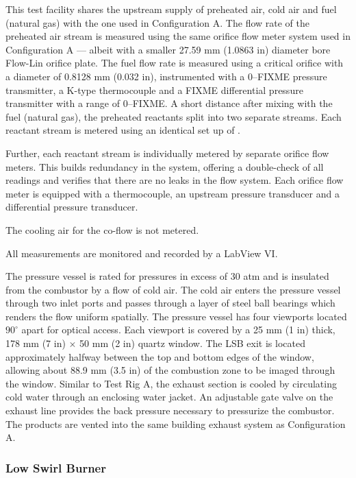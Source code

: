 This test facility shares the upstream supply of preheated air, cold air and fuel (natural gas) with the one used in Configuration A.
The flow rate of the preheated air stream is measured using the same orifice flow meter system used in Configuration A --- albeit with a smaller 27.59 mm (1.0863 in) diameter bore Flow-Lin orifice plate.
The fuel flow rate is measured using a critical orifice with a diameter of 0.8128 mm (0.032 in), instrumented with a 0--FIXME pressure transmitter, a K-type thermocouple and a FIXME differential pressure transmitter with a range of 0--FIXME.
A short distance after mixing with the fuel (natural gas), the preheated reactants split into two separate streams.
Each reactant stream is metered using an identical set up of .

Further, each reactant stream is individually metered by separate orifice flow meters.
This builds redundancy in the system, offering a double-check of all readings and verifies that there are no leaks in the flow system.
Each orifice flow meter is equipped with a thermocouple, an upstream pressure transducer and a differential pressure transducer.

The cooling air for the co-flow is not metered.

All measurements are monitored and recorded by a LabView VI.

The pressure vessel is rated for pressures in excess of 30 atm and is insulated from the combustor by a flow of cold air.
The cold air enters the pressure vessel through two inlet ports and passes through a layer of steel ball bearings which renders the flow uniform spatially.
The pressure vessel has four viewports located \(90^\circ\) apart for optical access.
Each viewport is covered by a 25 mm (1 in) thick, 178 mm (7 in) \(\times\) 50 mm (2 in) quartz window.
The LSB exit is located approximately halfway between the top and bottom edges of the window, allowing about 88.9 mm (3.5 in) of the combustion zone to be imaged through the window.
Similar to Test Rig A, the exhaust section is cooled by circulating cold water through an enclosing water jacket.
An adjustable gate valve on the exhaust line provides the back pressure necessary to pressurize the combustor.
The products are vented into the same building exhaust system as Configuration A.

\subsubsection{Low Swirl Burner}

